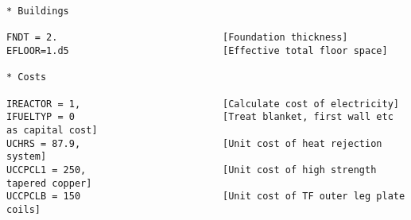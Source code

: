\documentclass[11pt,a4paper]{report}
\begin{document}
\begin{verbatim}
* Buildings

FNDT = 2.                             [Foundation thickness]
EFLOOR=1.d5                           [Effective total floor space]

* Costs

IREACTOR = 1,                         [Calculate cost of electricity]
IFUELTYP = 0                          [Treat blanket, first wall etc as capital cost]
UCHRS = 87.9,                         [Unit cost of heat rejection system]
UCCPCL1 = 250,                        [Unit cost of high strength tapered copper]
UCCPCLB = 150                         [Unit cost of TF outer leg plate coils]
\end{verbatim}
\normalsize
\end{document}
